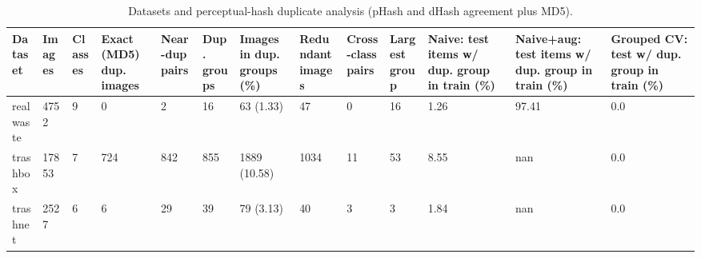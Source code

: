 \begin{table}[ht]
\centering
\small
\caption{Datasets and perceptual-hash duplicate analysis (pHash and dHash agreement plus MD5).}
\label{tab:tab1_datasets_duplicates}
\begin{tabular}{lllllllllllll}
\hline
Dataset & Images & Classes & Exact (MD5) dup. images & Near-dup pairs & Dup. groups & Images in dup. groups (\%) & Redundant images & Cross-class pairs & Largest group & Naive: test items w/ dup. group in train (\%) & Naive+aug: test items w/ dup. group in train (\%) & Grouped CV: test w/ dup. group in train (\%) \\
\hline
realwaste & 4752 & 9 & 0 & 2 & 16 & 63 (1.33) & 47 & 0 & 16 & 1.26 & 97.41 & 0.0 \\
trashbox & 17853 & 7 & 724 & 842 & 855 & 1889 (10.58) & 1034 & 11 & 53 & 8.55 & nan & 0.0 \\
trashnet & 2527 & 6 & 6 & 29 & 39 & 79 (3.13) & 40 & 3 & 3 & 1.84 & nan & 0.0 \\
\hline
\end{tabular}
\end{table}